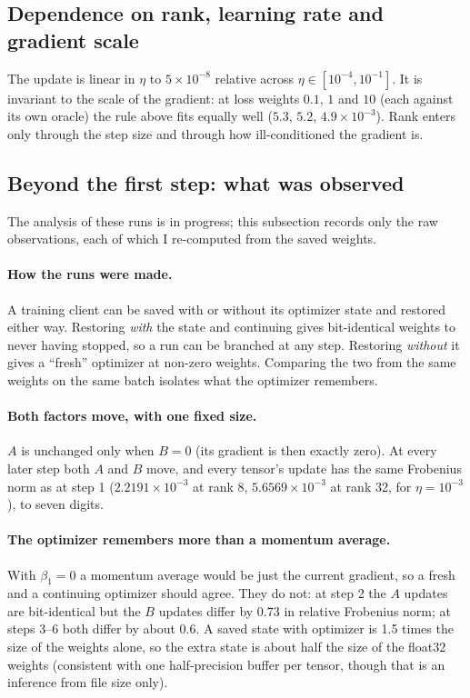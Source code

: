 \documentclass[11pt]{article}
\begin{document}
\subsection{Dependence on rank, learning rate and gradient scale}
The update is linear in $\eta$ to $5\times10^{-8}$ relative across $\eta\in[10^{-4},10^{-1}]$. It is
invariant to the scale of the gradient: at loss weights $0.1$, $1$ and $10$ (each against its own
oracle) the rule above fits equally well ($5.3$, $5.2$, $4.9\times10^{-3}$). Rank enters only
through the step size and through how ill-conditioned the gradient is.
\subsection{Beyond the first step: what was observed}\label{sec:multi}
The analysis of these runs is in progress; this subsection records only the raw observations,
each of which I re-computed from the saved weights.

\paragraph{How the runs were made.} A training client can be saved with or without its
optimizer state and restored either way. Restoring \emph{with} the state and continuing gives
bit-identical weights to never having stopped, so a run can be branched at any step. Restoring
\emph{without} it gives a ``fresh'' optimizer at non-zero weights. Comparing the two from the
same weights on the same batch isolates what the optimizer remembers.

\paragraph{Both factors move, with one fixed size.} $A$ is unchanged only when $B=0$ (its
gradient is then exactly zero). At every later step both $A$ and $B$ move, and every tensor's
update has the same Frobenius norm as at step 1 ($2.2191\times10^{-3}$ at rank 8,
$5.6569\times10^{-3}$ at rank 32, for $\eta=10^{-3}$), to seven digits.

\paragraph{The optimizer remembers more than a momentum average.} With $\beta_1=0$ a momentum
average would be just the current gradient, so a fresh and a continuing optimizer should agree.
They do not: at step 2 the $A$ updates are bit-identical but the $B$ updates differ by 0.73 in
relative Frobenius norm; at steps 3--6 both differ by about 0.6. A saved state with optimizer
is 1.5 times the size of the weights alone, so the extra state is about half the size of the
float32 weights (consistent with one half-precision buffer per tensor, though that is an
inference from file size only).
\end{document}
